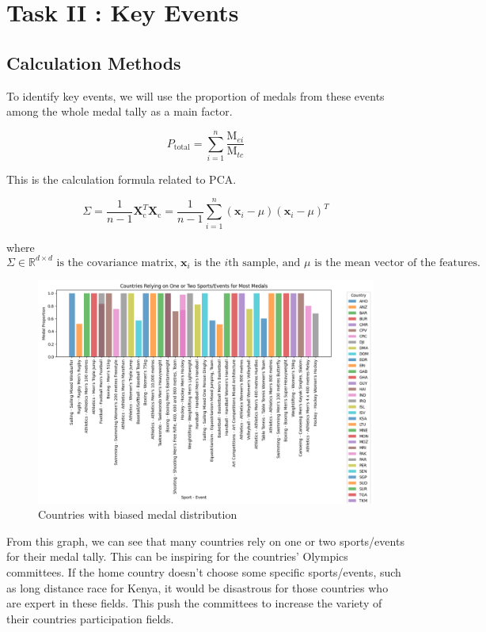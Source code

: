 \section{Task II : Key Events}
\subsection*{Calculation Methods}
To identify key events, we will use the proportion of medals from these events among the whole medal tally as a main factor.

\[
P_{\text{total}} = \sum_{i=1}^{n} \frac{\text{M}_{ei}}{\text{M}_{tc}}
\]

This is the calculation formula related to PCA.\cite{brown2021data}

\[
\Sigma = \frac{1}{n-1} \mathbf{X}_{\text{c}}^T \mathbf{X}_{\text{c}} = \frac{1}{n-1} \sum_{i=1}^{n} \left( \mathbf{x}_i - \mu \right) \left( \mathbf{x}_i - \mu \right)^T
\]

where
\[
\Sigma \in \mathbb{R}^{d \times d} \text{ is the covariance matrix, } \mathbf{x}_i \text{ is the } i\text{th sample, and } \mu \text{ is the mean vector of the features.}
\]

\begin{figure}[htbp]
    \centering
    \includegraphics[width=1\textwidth]{./figures/Key_event.png}
    \caption{ Countries with biased medal distribution}
    \label{fig:Key_event}
\end{figure}

From this graph, we can see that many countries rely on one or two sports/events for their medal tally. This can be inspiring for the countries' Olympics committees.
If the home country doesn't choose some specific sports/events, such as long distance race for Kenya, it would be disastrous for those countries who are expert in these fields.
This push the committees to increase the variety of their countries participation fields.
